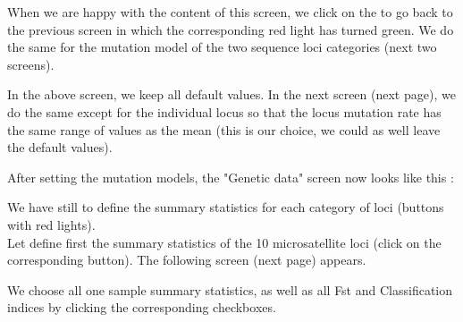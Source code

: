 When we are happy with the content of this screen, we click on the   to go back to the previous screen in which the corresponding red light has turned green. We do the same for the mutation model of the two sequence loci categories (next two screens).


In the above screen, we keep all default values. In the next screen (next page), we do the same except for the individual locus so that the locus mutation rate has the same range of values as the mean (this is our choice, we could as well leave the default values).
\newpage



After setting the mutation models, the "Genetic data" screen now looks like this :


We have still to define the summary statistics for each category of loci (buttons with red lights).\\

Let define first the summary statistics of the 10 microsatellite  loci (click on the corresponding   button). The following screen (next page) appears.


\newpage
We choose all one sample summary statistics, as well as all Fst and Classification indices by clicking the corresponding checkboxes.

